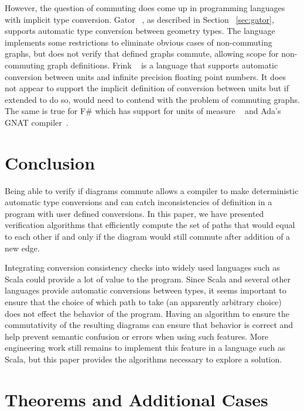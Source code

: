 \documentclass[sigplan,review]{acmart}
\begin{document}
{However, the question of commuting does come up in programming languages with implicit type conversion.
Gator ~\cite{gator}, as described in Section ~\ref{sec:gator}, supports automatic type conversion between geometry types.
The language implements some restrictions to eliminate obvious cases of non-commuting graphs, but does not verify that defined graphs commute, allowing scope for non-commuting graph definitions.
Frink ~\cite{frink} is a language that supports automatic conversion between units and infinite precision floating point numbers.
It does not appear to support the implicit definition of conversion between units  but if extended to do so, would need to contend with the problem of commuting graphs.
The same is true for F\# which has support for units of measure ~\cite{unitsOfMeasure} and Ada's GNAT compiler~\cite{gnat}.

\section{Conclusion}

Being able to verify if diagrams commute allows a compiler to make
deterministic automatic type conversions and can catch inconsistencies of definition in a program with user defined conversions.  In this paper, we have presented verification algorithms that efficiently compute the set of paths that would equal to each other if and only if the diagram would still commute after addition of a new edge.

Integrating conversion consistency checks into widely used languages such as Scala could provide a lot of value to the program.
Since Scala and several other languages provide automatic conversions between types, it seems important to ensure that the choice of which path to take (an apparently arbitrary choice) does not effect the behavior of the program.
Having an algorithm to ensure the commutativity of the resulting diagrams can ensure that behavior is correct and help prevent semantic confusion or errors when using such features.
More engineering work still remains to implement this feature in a language such as Scala, but this paper provides the algorithms necessary to explore a solution.




\appendix

\section{Theorems and Additional Cases}

}
\end{document}
